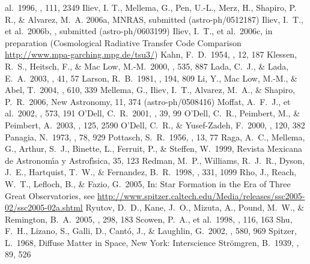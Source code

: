 \documentclass[preprint]{rmxac}
\begin{document}
\begin{thebibliography}
al.\ 1996, \aj, 111, 2349 
 Iliev, I. T., Mellema, G.,
  Pen, U.-L., Merz, H., Shapiro, P. R., \& Alvarez, M.~A.  2006a,
  MNRAS, submitted (astro-ph/0512187)
 Iliev, I.~T., et
  al.\ 2006b, \mnras, submitted (astro-ph/0603199)
 Iliev, I.~T., et
  al.\ 2006c, in preparation (Cosmological Radiative Transfer Code Comparison  
  \url{http://www.mpa-garching.mpg.de/tsu3/})
 Kahn, F.~D.\ 1954, \bain, 12, 187 
 Klessen, R.~S.,
  Heitsch, F., \& Mac Low, M.-M.\ 2000, \apj, 535, 887
 Lada, C.~J., \&
Lada, E.~A.\ 2003, \araa, 41, 57 
 Larson, R.~B.\ 1981,
\mnras, 194, 809 
 Li, Y., Mac Low, M.-M.,
\& Abel, T.\ 2004, \apj, 610, 339 
 Mellema, G.,
  Iliev, I.~T., Alvarez, M.~A., \& Shapiro, P.~R.\ 2006, New
  Astronomy, 11, 374 (astro-ph/0508416)
 Moffat, A.~F.~J., et 
al.\ 2002, \apj, 573, 191 
 O'Dell, C.~R.\ 2001, \araa, 39, 
99 
 O'Dell, C.~R., Peimbert, 
M., \& Peimbert, A.\ 2003, \aj, 125, 2590 
  O'Dell, C.~R., 
\& Yusef-Zadeh, F.\ 2000, \aj, 120, 382 
 Panagia, N.\ 1973, \aj,
78, 929 
 Pottasch, S.~R.\ 1956, \bain, 
13, 77 
 Raga, A.~C., Mellema, G., 
Arthur, S.~J., Binette, L., Ferruit, P., \& Steffen, W.\ 1999, Revista 
Mexicana de Astronom\'\i{}a y Astrof\'\i{}sica, 35, 123
 Redman, M.~P., Williams, 
R.~J.~R., Dyson, J.~E., Hartquist, T.~W., \& Fernandez, B.~R.\ 1998, \aap, 
331, 1099 
 Rho, J., Reach, W.~T., 
Lefloch, B., \& Fazio, G.\ 2005, In: Star Formation in the Era of Three Great 
Observatories, see
\url{http://www.spitzer.caltech.edu/Media/releases/ssc2005-02/ssc2005-02a.shtml}
 Ryutov, D.~D., Kane, 
J.~O., Mizuta, A., Pound, M.~W., \& Remington, B.~A.\ 2005, \apss, 298, 183 
 Scowen, P.~A., et al.\ 
1998, \aj, 116, 163 
 Shu, F.~H., Lizano, S., 
Galli, D., Cant{\'o}, J., \& Laughlin, G.\ 2002, \apj, 580, 969 
\bibitem[Spitzer(1968)]{1968dms..book.....S} Spitzer, L.\ 1968,
  Diffuse Matter in Space, New York: Interscience
 Str{\"o}mgren, B.\ 1939, 
\apj, 89, 526 
\end{thebibliography}
\end{document}
